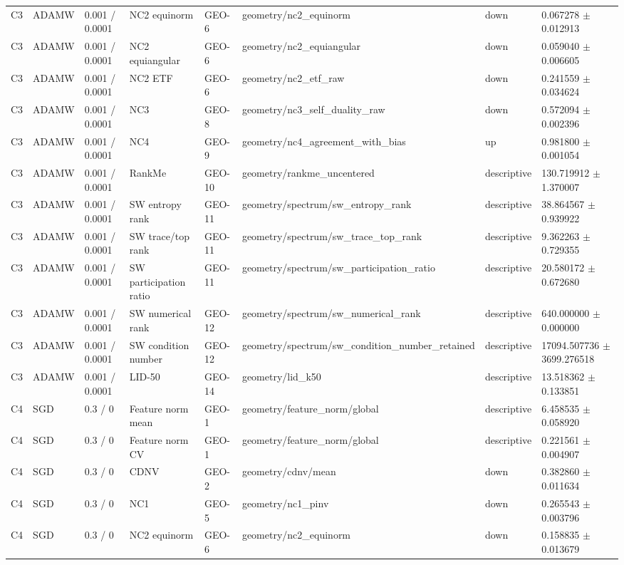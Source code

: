 \begin{longtable}{llllllll}
C3 & ADAMW & 0.001 / 0.0001 & NC2 equinorm & GEO-6 & geometry/nc2\_equinorm & down & 0.067278 $\pm$ 0.012913 \\
C3 & ADAMW & 0.001 / 0.0001 & NC2 equiangular & GEO-6 & geometry/nc2\_equiangular & down & 0.059040 $\pm$ 0.006605 \\
C3 & ADAMW & 0.001 / 0.0001 & NC2 ETF & GEO-6 & geometry/nc2\_etf\_raw & down & 0.241559 $\pm$ 0.034624 \\
C3 & ADAMW & 0.001 / 0.0001 & NC3 & GEO-8 & geometry/nc3\_self\_duality\_raw & down & 0.572094 $\pm$ 0.002396 \\
C3 & ADAMW & 0.001 / 0.0001 & NC4 & GEO-9 & geometry/nc4\_agreement\_with\_bias & up & 0.981800 $\pm$ 0.001054 \\
C3 & ADAMW & 0.001 / 0.0001 & RankMe & GEO-10 & geometry/rankme\_uncentered & descriptive & 130.719912 $\pm$ 1.370007 \\
C3 & ADAMW & 0.001 / 0.0001 & SW entropy rank & GEO-11 & geometry/spectrum/sw\_entropy\_rank & descriptive & 38.864567 $\pm$ 0.939922 \\
C3 & ADAMW & 0.001 / 0.0001 & SW trace/top rank & GEO-11 & geometry/spectrum/sw\_trace\_top\_rank & descriptive & 9.362263 $\pm$ 0.729355 \\
C3 & ADAMW & 0.001 / 0.0001 & SW participation ratio & GEO-11 & geometry/spectrum/sw\_participation\_ratio & descriptive & 20.580172 $\pm$ 0.672680 \\
C3 & ADAMW & 0.001 / 0.0001 & SW numerical rank & GEO-12 & geometry/spectrum/sw\_numerical\_rank & descriptive & 640.000000 $\pm$ 0.000000 \\
C3 & ADAMW & 0.001 / 0.0001 & SW condition number & GEO-12 & geometry/spectrum/sw\_condition\_number\_retained & descriptive & 17094.507736 $\pm$ 3699.276518 \\
C3 & ADAMW & 0.001 / 0.0001 & LID-50 & GEO-14 & geometry/lid\_k50 & descriptive & 13.518362 $\pm$ 0.133851 \\
C4 & SGD & 0.3 / 0 & Feature norm mean & GEO-1 & geometry/feature\_norm/global & descriptive & 6.458535 $\pm$ 0.058920 \\
C4 & SGD & 0.3 / 0 & Feature norm CV & GEO-1 & geometry/feature\_norm/global & descriptive & 0.221561 $\pm$ 0.004907 \\
C4 & SGD & 0.3 / 0 & CDNV & GEO-2 & geometry/cdnv/mean & down & 0.382860 $\pm$ 0.011634 \\
C4 & SGD & 0.3 / 0 & NC1 & GEO-5 & geometry/nc1\_pinv & down & 0.265543 $\pm$ 0.003796 \\
C4 & SGD & 0.3 / 0 & NC2 equinorm & GEO-6 & geometry/nc2\_equinorm & down & 0.158835 $\pm$ 0.013679 \\

\end{longtable}
